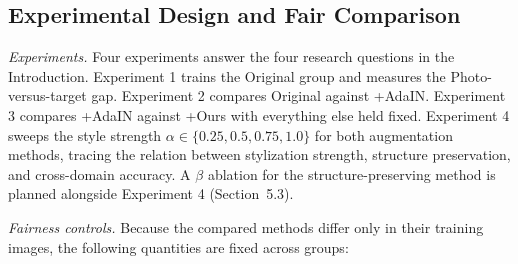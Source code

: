 \subsection{Experimental Design and Fair Comparison}
\label{sec:exp_design}

\textit{Experiments.} Four experiments answer the four research questions in the Introduction. Experiment 1 trains the Original group and measures the Photo-versus-target gap. Experiment 2 compares Original against +AdaIN. Experiment 3 compares +AdaIN against +Ours with everything else held fixed. Experiment 4 sweeps the style strength $\alpha \in \{0.25, 0.5, 0.75, 1.0\}$ for both augmentation methods, tracing the relation between stylization strength, structure preservation, and cross-domain accuracy. A $\beta$ ablation for the structure-preserving method is planned alongside Experiment 4 (Section~5.3).

\textit{Fairness controls.} Because the compared methods differ only in their training images, the following quantities are fixed across groups:

